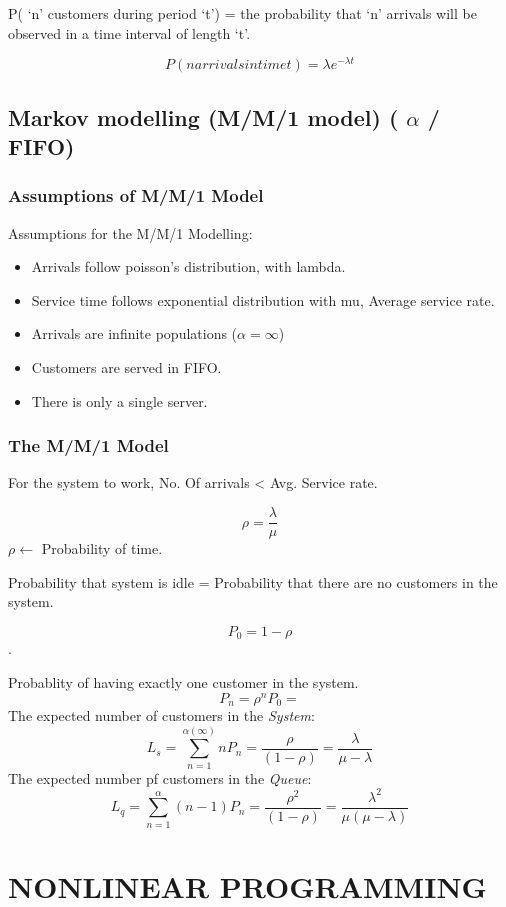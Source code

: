 \documentclass[12pt, letterpaper]{article}
\begin{document}
\begin{center}
    P( ‘n’ customers during period ‘t’) = the probability that ‘n’ arrivals will be observed in a time interval of length ‘t’.
\end{center}

\begin{equation}
    P(n arrivals in time t) = \lambda e^{-\lambda t}
\end{equation}

\subsection{Markov modelling (M/M/1 model) ( $\alpha$ / FIFO)}
\subsubsection{Assumptions of M/M/1 Model}
Assumptions for the M/M/1 Modelling:
\begin{itemize}
    \item Arrivals follow poisson’s distribution, with lambda.
    \item Service time follows exponential distribution with mu, Average service rate.
    \item Arrivals are infinite populations ($\alpha = \infty$)
    \item Customers are served in FIFO.
    \item There is only a single server.
\end{itemize}
 
\subsubsection{The M/M/1 Model}
For the system to work, No. Of arrivals < Avg. Service rate.

$$\rho = \frac{\lambda}{\mu} $$ 
$ \rho \leftarrow $ Probability of time.

Probability that system is idle = Probability that there are no customers in the system.

$$P_0 = 1 - \rho$$.

Probablity of having exactly one customer in the system.
$$ P_n = \rho^n P_0  = $$
The expected number of customers in the \emph{System}:
$$ L_s =  \sum_{n=1}^{\alpha (\infty)} n P_n 
= \frac{\rho}{(1-\rho)} = \frac{\lambda}{\mu-\lambda} $$
The expected number pf customers in the \emph{Queue}:
$$ L_q = \sum_{n=1}^{\alpha} (n-1)P_n  = \frac{\rho^2}{(1 - \rho)} = \frac{\lambda^2}{\mu(\mu - \lambda)}$$
\section{NONLINEAR PROGRAMMING}
\end{document}

